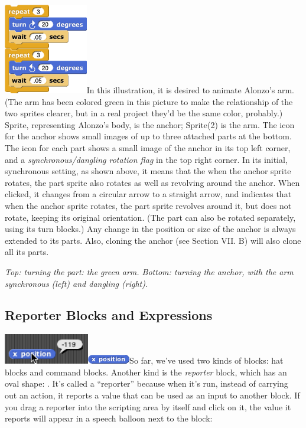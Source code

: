 \includegraphics[width=1.44444in,height=1.5625in]{media/image56.png}In
this illustration, it is desired to animate Alonzo's arm. (The arm has
been colored green in this picture to make the relationship of the two
sprites clearer, but in a real project they'd be the same color,
probably.) Sprite, representing Alonzo's body, is the anchor; Sprite(2)
is the arm. The icon for the anchor shows small images of up to three
attached parts at the bottom. The icon for each part shows a small image
of the anchor in its top left corner, and a \emph{synchronous/dangling
rotation flag} in the top right corner. In its initial, synchronous
setting, as shown above, it means that the when the anchor sprite
rotates, the part sprite also rotates as well as revolving around the
anchor. When clicked, it changes from a circular arrow to a straight
arrow, and indicates that when the anchor sprite rotates, the part
sprite revolves around it, but does not rotate, keeping its original
orientation. (The part can also be rotated separately, using its turn
blocks.) Any change in the position or size of the anchor is always
extended to its parts. Also, cloning the anchor (see Section VII. B)
will also clone all its parts.

\emph{Top: turning the part: the green arm. Bottom: turning the anchor,
with the arm synchronous (left) and dangling (right).}

\subsection{Reporter Blocks and
Expressions}\label{reporter-blocks-and-expressions}

\includegraphics[width=1.47in,height=0.52in]{media/image65.png}\includegraphics[width=0.72917in,height=0.15625in]{media/image66.png}So
far, we've used two kinds of blocks: hat blocks and command blocks.
Another kind is the \emph{reporter} block, which has an oval shape: .
It's called a ``reporter'' because when it's run, instead of carrying
out an action, it reports a value that can be used as an input to
another block. If you drag a reporter into the scripting area by itself
and click on it, the value it reports will appear in a speech balloon
next to the block:

